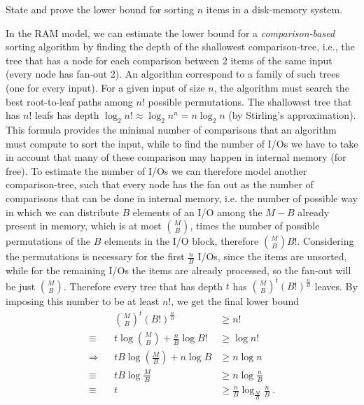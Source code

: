 \exercise

State and prove the lower bound for sorting $n$ items in a disk-memory system.

\solution

In the RAM model, we can estimate the lower bound for a \emph{comparison-based}
sorting algorithm by finding the depth of the shallowest comparison-tree, i.e.,
the tree that has a node for each comparison between 2 items of the same input
(every node has fan-out 2). An algorithm correspond to a family of such trees
(one for every input). For a given input of size $n$, the algorithm must search
the best root-to-leaf paths among $n!$ possible permutations. The shallowest
tree that has $n!$ leafs has depth $\log_2 n! \approx \log_2 n^n = n\log_2 n$
(by Stirling's approximation). This formula provides the minimal number of
comparisons that an algorithm must compute to sort the input, while to find the
number of I/Os we have to take in account that many of these comparison may
happen in internal memory (for free). To estimate the number of I/Os we can
therefore model another comparison-tree, such that every node has the fan out as
the number of comparisons that can be done in internal memory, i.e. the number
of possible way in which we can distribute $B$ elements of an I/O among the $M -
B$ already present in memory, which is at most ${M}\choose{B}$, times the number
of possible permutations of the $B$ elements in the I/O block, therefore ${M
\choose B} B!$. Considering the permutations is necessary for the first
$\frac{n}{B}$ I/Os, since the items are unsorted, while for the remaining I/Os
the items are already processed, so the fan-out will be just $M \choose B$.
Therefore every tree that has depth $t$ has ${M \choose B}^t (B!)^\frac{n}{B}$
leaves. By imposing this number to be at least $n!$, we get the final lower bound
%
\begin{align*}
              && && && && {M \choose B}^t (B!)^\frac{n}{B} &\ge n! && && &&\\
  && && && \equiv      && t\log{{M \choose B}} + \frac{n}{B}\log{B!} &\ge \log{n!} && && &&\\
  && && && \Rightarrow && tB\log{\left(\frac{M}{B}\right)} + n\log{B} &\ge n\log{n} && && &&\\
  && && && \equiv      && tB\log{\frac{M}{B}} &\ge n\log{\frac{n}{B}} && && &&\\
  && && && \equiv      && t &\ge \frac{n}{B}\log_{\frac{M}{B}}{\frac{n}{B}}\ . && && &&\\
\end{align*}
%
